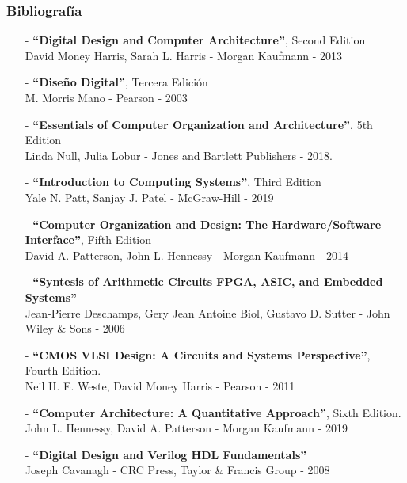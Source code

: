 \documentclass[aspectratio=169]{beamer}
\begin{document}
\begin{frame}[fragile]
    \frametitle{Bibliografía}
    \begin{itemize}
    \setlength\itemsep{0.1cm}
    \footnotesize
    \item[-] \textbf{``Digital Design and Computer Architecture''}, Second Edition\\
    David Money Harris, Sarah L. Harris - Morgan Kaufmann - 2013\\    
    \item[-] \textbf{``Diseño Digital''}, Tercera Edición\\
    M. Morris Mano - Pearson - 2003\\
    \item[-] \textbf{“Essentials of Computer Organization and Architecture”}, 5th Edition\\
    Linda Null, Julia Lobur - Jones and Bartlett Publishers - 2018.\\
    \item[-] \textbf{``Introduction to Computing Systems''}, Third Edition\\
    Yale N. Patt, Sanjay J. Patel - McGraw-Hill - 2019\\
    \item[-] \textbf{``Computer Organization and Design: The Hardware/Software Interface''}, Fifth Edition\\
    David A. Patterson, John L. Hennessy - Morgan Kaufmann - 2014\\
    \item[-] \textbf{``Syntesis of Arithmetic Circuits FPGA, ASIC, and Embedded Systems''}\\
    Jean-Pierre Deschamps, Gery Jean Antoine Biol, Gustavo D. Sutter - John Wiley \& Sons - 2006\\
    \item[-] \textbf{``CMOS VLSI Design: A Circuits and Systems Perspective''}, Fourth Edition.\\
    Neil H. E. Weste, David Money Harris - Pearson - 2011\\
    \item[-] \textbf{``Computer Architecture: A Quantitative Approach''}, Sixth Edition.\\
    John L. Hennessy, David A. Patterson - Morgan Kaufmann - 2019\\
    \item[-] \textbf{``Digital Design and Verilog HDL Fundamentals''}\\
    Joseph Cavanagh - CRC Press, Taylor \& Francis Group - 2008\\
    \end{itemize}
\end{frame}
\end{document}
